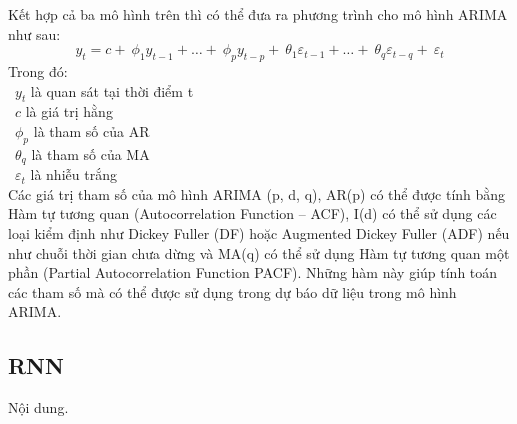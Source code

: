 Kết hợp cả ba mô hình trên thì có thể đưa ra phương trình cho mô hình ARIMA như sau:
\[y_{t} = c + \ \phi_{1}y_{t - 1} + \ldots + \ \phi_{p}y_{t - p} + \ \theta_{1}\varepsilon_{t - 1} + \ldots + \ \theta_{q}\varepsilon_{t - q} + \ \varepsilon_{t}\]
Trong đó:\\
    \indent\textbullet\ \(y_{t}\) là quan sát tại thời điểm t\\
    \indent\textbullet\ \(c\) là giá trị hằng\\
    \indent\textbullet\ \(\phi_{p}\) là tham số của AR\\
    \indent\textbullet\ \(\theta_{q}\) là tham số của MA\\
    \indent\textbullet\ \(\varepsilon_{t}\) là nhiễu trắng\\

Các giá trị tham số của mô hình ARIMA (p, d, q), AR(p) có thể được tính bằng Hàm tự tương quan (Autocorrelation Function – ACF), I(d) có thể sử dụng các loại kiểm định như Dickey Fuller (DF) hoặc Augmented Dickey Fuller (ADF) nếu như chuỗi thời gian chưa dừng và MA(q) có thể sử dụng Hàm tự tương quan một phần (Partial Autocorrelation Function PACF). Những hàm này giúp tính toán các tham số mà có thể được sử dụng trong dự báo dữ liệu trong mô hình ARIMA.

\subsection{RNN}
Nội dung. 
